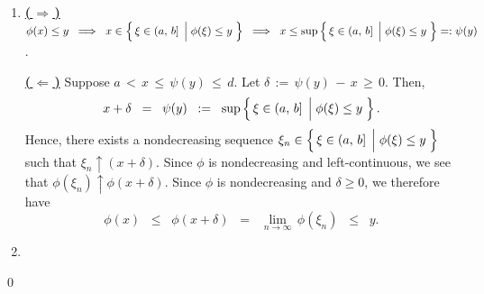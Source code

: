 \begin{enumerate}
\item
	\textbf{\underline{(\,$\Longrightarrow$\,)}}\quad
	$\phi(x) \leq y
	\;\;\Longrightarrow\;\;
		x \in \left\{\,\xi\in(a,\,b] \;\left\vert\; \phi(\xi) \overset{{\color{white}.}}{\leq} y\right.\,\right\}
	\;\; \Longrightarrow \;\;
		x \leq \sup\left\{\,\xi\in(a,\,b] \;\left\vert\; \phi(\xi) \overset{{\color{white}.}}{\leq} y\right.\,\right\} =: \psi(y)$.

	\vskip 0.2cm
	\noindent
	\textbf{\underline{(\,$\Longleftarrow$\,)}}\quad
	Suppose \;$a \,<\, x \,\leq\, \psi(y) \,\leq\, d$.\;
	Let \;$\delta \,:=\, \psi(y) \,-\, x \,\geq\, 0$. Then,
	\begin{equation*}
	x + \delta \;\;=\;\; \psi(y) \;\;:=\;\; \sup\left\{\,\xi\in(a,\,b] \;\left\vert\; \phi(\xi) \overset{{\color{white}.}}{\leq} y\right.\,\right\}.
	\end{equation*}
	Hence, there exists a nondecreasing sequence
	$\xi_{n} \in \left\{\,\xi\in(a,\,b] \;\left\vert\; \phi(\xi) \overset{{\color{white}.}}{\leq} y\right.\,\right\}$
	such that $\xi_{n} \uparrow (x+\delta)$.
	Since $\phi$ is {\color{red}nondecreasing and left-continuous}, we see that $\phi(\xi_{n}) \uparrow \phi(x+\delta)$.
	Since $\phi$ is nondecreasing and $\delta \geq 0$, we therefore have
	\begin{equation*}
	\phi(x) \;\;\leq\;\; \phi(x+\delta) \;\;=\;\; \underset{n\rightarrow\infty}{\lim}\,\phi(\xi_{n}) \;\;\leq\;\; y.
	\end{equation*}
\item
\end{enumerate}
\qed



